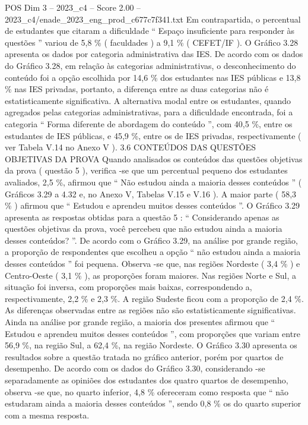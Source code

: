 \begin{textsample}{POS Dim 3 – 2023\_c4 – Score 2.00 – 2023\_c4/enade\_2023\_eng\_prod\_c677c7f341.txt}
Em contrapartida, o percentual de estudantes que citaram a dificuldade “ Espaço insuficiente para responder às questões ” variou de 5,8 \% ( faculdades ) a 9,1 \% ( CEFET/IF ).
O Gráfico 3.28 apresenta os dados por categoria administrativa das IES.
De acordo com os dados do Gráfico 3.28, em relação às categorias administrativas, o desconhecimento do conteúdo foi a opção escolhida por 14,6 \% dos estudantes nas IES públicas e 13,8 \% nas IES privadas, portanto, a diferença entre as duas categorias não é estatisticamente significativa.
A alternativa modal entre os estudantes, quando agregados pelas categorias administrativas, para a dificuldade encontrada, foi a categoria “ Forma diferente de abordagem do conteúdo ”, com 40,5 \%, entre os estudantes de IES públicas, e 45,9 \%, entre os de IES privadas, respectivamente ( ver Tabela V.14 no Anexo V ). 3.6 CONTEÚDOS DAS QUESTÕES OBJETIVAS DA PROVA Quando analisados os conteúdos das questões objetivas da prova ( questão 5 ), verifica -se que um percentual pequeno dos estudantes avaliados, 2,5 \%, afirmou que “ Não estudou ainda a maioria desses conteúdos ” ( Gráficos 3.29 a 4.32 e, no Anexo V, Tabelas V.15 e V.16 ).
A maior parte ( 58,3 \% ) afirmou que “ Estudou e aprendeu muitos desses conteúdos ”.
O Gráfico 3.29 apresenta as respostas obtidas para a questão 5 : “ Considerando apenas as questões objetivas da prova, você percebeu que não estudou ainda a maioria desses conteúdos? ”.
De acordo com o Gráfico 3.29, na análise por grande região, a proporção de respondentes que escolheu a opção “ não estudou ainda a maioria desses conteúdos ” foi pequena.
Observa -se que, nas regiões Nordeste ( 3,4 \% ) e Centro-Oeste ( 3,1 \% ), as proporções foram maiores.
Nas regiões Norte e Sul, a situação foi inversa, com proporções mais baixas, correspondendo a, respectivamente, 2,2 \% e 2,3 \%.
A região Sudeste ficou com a proporção de 2,4 \%.
As diferenças observadas entre as regiões não são estatisticamente significativas.
Ainda na análise por grande região, a maioria dos presentes afirmou que “ Estudou e aprendeu muitos desses conteúdos ”, com proporções que variam entre 56,9 \%, na região Sul, a 62,4 \%, na região Nordeste.
O Gráfico 3.30 apresenta os resultados sobre a questão tratada no gráfico anterior, porém por quartos de desempenho.
De acordo com os dados do Gráfico 3.30, considerando -se separadamente as opiniões dos estudantes dos quatro quartos de desempenho, observa -se que, no quarto inferior, 4,8 \% ofereceram como resposta que “ não estudaram ainda a maioria desses conteúdos ”, sendo 0,8 \% os do quarto superior com a mesma resposta.

\end{textsample}

